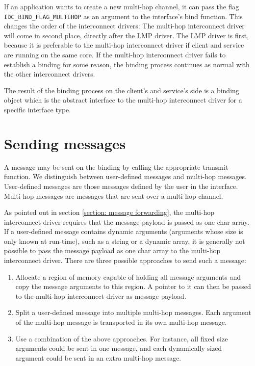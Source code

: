 \documentclass[a4paper,twoside]{report} %
\begin{document}
If an application wants to create a new multi-hop channel, it can pass the flag \texttt{IDC\_BIND\_FLAG\_MULTIHOP} as an argument to the interface's bind function. This changes the order of the interconnect drivers: The multi-hop interconnect driver will come in second place, directly after the LMP driver. The LMP driver is first, because it is preferable to the multi-hop interconnect driver if client and service are running on the same core. If the multi-hop interconnect driver fails to establish a binding for some reason, the binding process continues as normal with the other interconnect drivers.

The result of the binding process on the client's and service's side is a binding object which is the abstract interface to the multi-hop interconnect driver for a specific interface type.


\section{Sending messages}
\label{section: flounder sending messages}
A message may be sent on the binding by calling the appropriate transmit function. We distinguish between user-defined messages and multi-hop messages. User-defined messages are those messages defined by the user in the interface. Multi-hop messages are messages that are sent over a multi-hop channel. 

As pointed out in section \ref{section: message forwarding}, the multi-hop interconnect driver requires that the message payload is passed as one char array. If a user-defined message contains dynamic arguments (arguments whose size is only known at run-time), such as a string or a dynamic array, it is generally not possible to pass the message payload as one char array to the multi-hop interconnect driver. There are three possible approaches to send such a message:

\begin{enumerate}
\item Allocate a region of memory capable of holding all message arguments and copy the message arguments to this region. A pointer to it can then be passed to the multi-hop interconnect driver as message payload.

\item Split a user-defined message into multiple multi-hop messages. Each argument of the multi-hop message is transported in its own multi-hop message. 

\item Use a combination of the above approaches. For instance, all fixed size arguments could be sent in one message, and each dynamically sized argument could be sent in an extra multi-hop message.
\end{enumerate}
\end{document}
